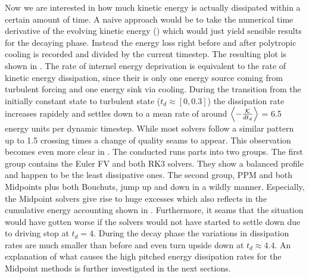  Now we
are interested in how much kinetic energy is actually dissipated within a
certain amount of time. A naive approach would be to take the numerical time
derivative of the evolving kinetic energy
() which would just yield
sensible results for the decaying phase. Instead the energy loss right before
and after polytropic cooling is recorded and divided by the current timestep.
The resulting plot is shown in
.  The rate of internel
energy deprivation is equivalent to the rate of kinetic energy dissipation,
since their is only one energy source coming from turbulent forcing and one
energy sink via cooling. During the transition from the initially constant
state to turbulent state ($t_d \approx [0,0.3]$) the dissipation rate increases
rapidely and settles down to a mean rate of around $\left\langle-\frac{\mathcal{K}}{dt_d}\right\rangle$ = 6.5
energy units per dynamic timestep. While most solvers follow a similar pattern
up to 1.5 crossing times a change of quality seams to appear. This observation
becomes even more clear in .  The
conducted runs parts into two groups. The first group contains the Euler FV and
both RK3 solvers. They show a balanced profile and happen to be the least
dissipative ones. The second group, PPM and both Midpoints plus both Bouchuts,
jump up and down in a wildly manner. Especially, the Midpoint solvers give rise
to huge excesses which also reflects in the cumulative energy accounting shown
in .  Furthermore,
it seams that the situation would have gotten worse if the solvers would not
have started to settle down due to driving stop at $t_d = 4$. During the decay
phase the variations in dissipation rates are much smaller than before and even
turn upside down at $t_d \approx 4.4$. An explanation of what causes the high
pitched energy dissipation rates for the Midpoint methods is further
investigated in the next sections.


